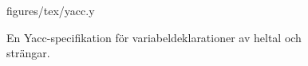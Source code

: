 \begin{figure}[ht]
    {figures/tex/yacc.y}
  \caption{En Yacc-specifikation för variabeldeklarationer av heltal och
    strängar.}
  \label{fig:yacc}
\end{figure}

